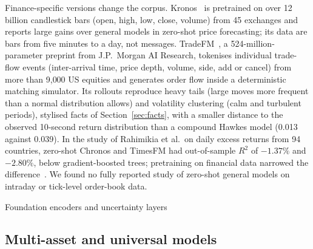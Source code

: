 Finance-specific versions change the corpus. Kronos~\citep{kronos2025} is pretrained on over 12
billion candlestick bars (open, high, low, close, volume) from 45 exchanges and reports large gains
over general models in zero-shot price forecasting; its data are bars from five minutes to a day, not
messages. TradeFM~\citep{tradefm2026}, a 524-million-parameter preprint from J.P.\ Morgan AI Research,
tokenises individual trade-flow events (inter-arrival time, price depth, volume, side, add or cancel)
from more than 9{,}000 US equities and generates order flow inside a deterministic matching simulator.
Its rollouts reproduce heavy tails (large moves more frequent than a normal distribution allows) and
volatility clustering (calm and turbulent periods), stylised facts of Section~\ref{sec:facts}, with a smaller distance to the observed
10-second return distribution than a compound Hawkes model (0.013 against 0.039). In the study of Rahimikia et al.\ on daily excess
returns from 94 countries, zero-shot Chronos and TimesFM had out-of-sample $R^2$ of $-1.37\%$ and $-2.80\%$,
below gradient-boosted trees; pretraining on financial data narrowed the difference~\citep{rahimikia2025tsfm}. We found no fully reported
study of zero-shot general models on intraday or tick-level order-book data.

\begin{modelcard}{Foundation encoders and uncertainty layers}
\end{modelcard}

\subsection{Multi-asset and universal models}
\label{sec:deep-multi}


